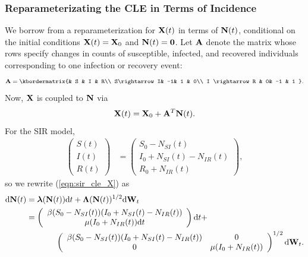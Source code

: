 \subsubsection{Reparameterizating the CLE in Terms of Incidence}
\label{subsubsec:cle_repar}
We borrow from \cite{breto2011compound,ho2016direct} a reparameterization for $ \mathbf{X} (t)$ in terms of $ \mathbf{N}(t) $, conditional on the initial conditions $ \mathbf{X}(t) = \mathbf{X}_0 $ and $ \mathbf{N}(t) = \boldsymbol{0} $. Let $ \mathbf{A} $ denote the matrix whose rows specify changes in counts of susceptible, infected, and recovered individuals corresponding to one infection or recovery event:
\begin{equation}
\label{eqn:sir_stoich}
\bA = \kbordermatrix{& S & I &  R\\
	S\rightarrow I& -1& 1 & 0\\
	I \rightarrow R & 0& -1 & 1
}.
\end{equation}
Now, $ \mathbf{X} $ is coupled to $ \mathbf{N} $ via 
\begin{equation}
\label{eqn:incid2prev}
\mathbf{X}(t) = \mathbf{X}_0 + \mathbf{A}^T\mathbf{N}(t).
\end{equation}
For the SIR model, 
\begin{align}
\left (\begin{array}{c}
S(t) \\
I(t) \\
R(t)
\end{array}\right ) &= \left (\begin{array}{c}
S_0 - N_{SI}(t) \\
I_0 + N_{SI}(t) - N_{IR}(t) \\
R_0 + N_{IR}(t)
\end{array}\right ),
\end{align}
so we rewrite (\ref{eqn:sir_cle_X}) as
\begin{align}
\label{eqn:sir_cle_N}
 \mathrm{d}\mathbf{N}(t)&= \boldsymbol{\lambda}(\mathbf{N}(t))\mathrm{d} t + \boldsymbol{\Lambda}(\mathbf{N}(t))^{1/2}\mathrm{d}\mathbf{W}_t \\
 &= \left (\begin{array}{cc}
\beta (S_0 - N_{SI}(t))(I_0 + N_{SI}(t) - N_{IR}(t))\\
\mu(I_0 + N_{IR}(t))\mathrm{d} t 
\end{array}\right )\mathrm{d} t + \nonumber\\
&\hspace{0.5in}\left(\begin{array}{cc}
\beta (S_0 - N_{SI}(t))(I_0 + N_{SI}(t) - N_{IR}(t)) & 0 \\
0 & \mu(I_0 + N_{IR}(t))
\end{array}\right)^{1/2}\mathrm{d}\mathbf{W}_t. \nonumber 
\end{align}


